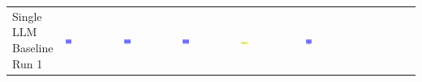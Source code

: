 \begin{table}
\begin{tabular}{@{}mmmmmm@{}}
    \makecell{Single LLM \\ Baseline \\ Run 1} & \includegraphics[width=0.13\textwidth]{./run_1/png/gpt-4o_results/MicrofluidicChip.png} & \includegraphics[width=0.13\textwidth]{./run_1/png/o1-preview_results/MicrofluidicChip.png} & \includegraphics[width=0.13\textwidth]{./run_1/png/claude-3-5-sonnet-20240620_results/MicrofluidicChip.png} & \includegraphics[width=0.13\textwidth]{./run_1/png/watsonx_meta-llama_llama-3-1-70b-instruct_results/MicrofluidicChip.png} & \includegraphics[width=0.13\textwidth]{./run_1/png/watsonx_meta-llama_llama-3-405b-instruct_results/MicrofluidicChip.png} \\

\end{tabular}
\end{table}

